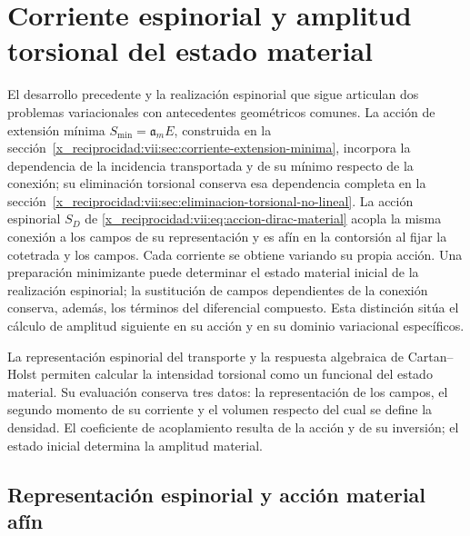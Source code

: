 \chapter{Corriente espinorial y amplitud torsional del estado material}
\label{x_reciprocidad:vii:sec:corriente-espinorial-densidad}

El desarrollo precedente y la realización espinorial que sigue articulan
dos problemas variacionales con antecedentes geométricos comunes. La
acción de extensión mínima \(S_{\min}=\mathfrak a_m E\), construida en
la sección~\ref{x_reciprocidad:vii:sec:corriente-extension-minima}, incorpora la
dependencia de la incidencia transportada y de su mínimo respecto de la
conexión; su eliminación torsional conserva esa dependencia completa en
la sección~\ref{x_reciprocidad:vii:sec:eliminacion-torsional-no-lineal}. La acción
espinorial \(S_D\) de \eqref{x_reciprocidad:vii:eq:accion-dirac-material} acopla la
misma conexión a los campos de su representación y es afín en la
contorsión al fijar la cotetrada y los campos. Cada corriente se obtiene
variando su propia acción. Una preparación minimizante puede determinar
el estado material inicial de la realización espinorial; la sustitución
de campos dependientes de la conexión conserva, además, los términos
del diferencial compuesto. Esta distinción sitúa el cálculo de amplitud
siguiente en su acción y en su dominio variacional específicos.

La representación espinorial del transporte y la respuesta algebraica
de Cartan--Holst permiten calcular la intensidad torsional como un
funcional del estado material. Su evaluación conserva tres datos:
la representación de los campos, el segundo momento de su corriente y
el volumen respecto del cual se define la densidad. El coeficiente de
acoplamiento resulta de la acción y de su inversión; el estado inicial
determina la amplitud material.

\section{Representación espinorial y acción material afín}
\label{x_reciprocidad:vii:subsec:accion-espinorial-afin}

